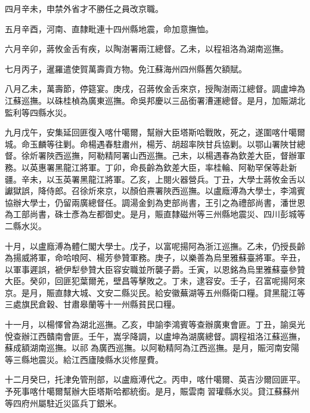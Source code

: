 \begin{pinyinscope}
四月辛未，申禁外省才不勝任之員改京職。

五月辛酉，河南、直隸毗連十四州縣地震，命加意撫恤。

六月辛卯，蔣攸金舌有疾，以陶澍署兩江總督。乙未，以程祖洛為湖南巡撫。

七月丙子，暹羅遣使賀萬壽貢方物。免江蘇海州四州縣舊欠額賦。

八月乙未，萬壽節，停筵宴。庚戌，召蔣攸金舌來京，授陶澍兩江總督。調盧坤為江蘇巡撫。以硃桂楨為廣東巡撫。命吳邦慶以三品銜署漕運總督。是月，加賑湖北監利等四縣水災。

九月戊午，安集延回匪復入喀什噶爾，幫辦大臣塔斯哈戰敗，死之，遂圍喀什噶爾城。命玉麟等往剿。命楊遇春駐肅州，楊芳、胡超率陜甘兵協剿。以鄂山署陜甘總督。徐炘署陜西巡撫，阿勒精阿署山西巡撫。己未，以楊遇春為欽差大臣，督辦軍務。以英惠署黑龍江將軍。丁卯，命長齡為欽差大臣，率桂輪、阿勒罕保等赴新疆。辛未，以玉英署黑龍江將軍。乙亥，上閱火器營兵。丁丑，大學士蔣攸金舌以讞獄誤，降侍郎。召徐炘來京，以顏伯燾署陜西巡撫。以盧廕溥為大學士，李鴻賓協辦大學士，仍留兩廣總督任。調湯金釗為吏部尚書，王引之為禮部尚書，潘世恩為工部尚書，硃士彥為左都御史。是月，賑直隸磁州等三州縣地震災、四川彭城等二縣水災。

十月，以盧廕溥為體仁閣大學士。戊子，以富呢揚阿為浙江巡撫。乙未，仍授長齡為揚威將軍，命哈哴阿、楊芳參贊軍務。庚子，以樂善為烏里雅蘇臺將軍。辛丑，以軍事遲誤，褫伊犁參贊大臣容安職並所襲子爵。壬寅，以恩銘為烏里雅蘇臺參贊大臣。癸卯，回匪犯葉爾羌，壁昌等擊敗之。丁未，逮容安。壬子，召富呢揚阿來京。是月，賑直隸大城、文安二縣災民。給安徽蕪湖等五州縣衛口糧。貸黑龍江等三處旗民倉穀、甘肅皋蘭等十一州縣貧民口糧。

十一月，以楊懌曾為湖北巡撫。乙亥，申諭李鴻賓等查辦廣東會匪。丁丑，諭吳光悅查辦江西贛南會匪。壬午，嵩孚降調，以盧坤為湖廣總督。調程祖洛江蘇巡撫，蘇成額湖南巡撫。以祁為廣西巡撫。以阿勒精阿為江西巡撫。是月，賑河南安陽等三縣地震災。給江西廬陵縣水災修屋費。

十二月癸巳，托津免管刑部，以盧廕溥代之。丙申，喀什噶爾、英吉沙爾回匪平。予死事喀什噶爾幫辦大臣塔斯哈都統銜。是月，賑雲南習瓘縣水災。貸江蘇蘇州等四府州屬駐近災區兵丁銀米。


\end{pinyinscope}